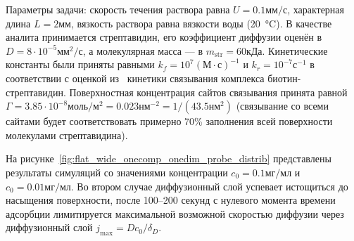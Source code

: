 \documentclass[oneside,final,12pt]{extreport}
\begin{document}
Параметры задачи:
скорость течения раствора равна $U = 0.1\text{мм}/\text{с}$,
характерная длина $L = 2\text{мм}$,
вязкость раствора равна вязкости воды (\SI{20}{\celsius}).
В качестве аналита принимается стрептавидин,
его коэффициент диффузии оценён в $D = 8\cdot10^{-5}\text{мм}^2/\text{с}$,
а молекулярная масса --- в $m_{\text{str}} = 60\text{кДа}$.
Кинетические константы были приняты равными%
\label{streptavidin_kinetics}
$k_f = 10^7\left(\text{М}\cdot\text{с}\right)^{-1}$
и $k_r = 10^{-7}\text{с}^{-1}$ в соответствии с оценкой из~%
\cite{bib:biotin_streptavidin_kinetics}
кинетики связывания комплекса биотин-стрептавидин.
Поверхностная концентрация сайтов связывания принята равной%
\label{Gamma0.7}
$\Gamma = 3.85\cdot10^{-8}\text{моль}/\text{м}^2 = 0.023\text{нм}^{-2} = 1/\left(43.5\text{нм}^2\right)$
(связывание со всеми сайтами будет соответствовать примерно
70\% заполнения всей поверхности молекулами стрептавидина).

На рисунке~\ref{fig:flat_wide_onecomp_onedim_probe_distrib}
представлены результаты симуляций со значениями концентрации
$c_0 = 0.1 \text{мг}/\text{мл}$ и $c_0 = 0.01 \text{мг}/\text{мл}$.
Во втором случае диффузионный слой успевает истощиться до насыщения поверхности,
после 100--200 секунд с нулевого момента времени адсорбции лимитируется
максимальной возможной скоростью диффузии через диффузионный слой
$j_{\text{max}} = D c_0 / \delta_D$.
\end{document}

